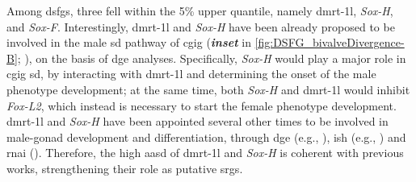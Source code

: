 Among \glspl{dsfg}, three fell within the 5\% upper quantile, namely \gls{dmrt-1l}, \textit{Sox-H}, and \textit{Sox-F}. Interestingly, \gls{dmrt-1l} and \textit{Sox-H} have been already proposed to be involved in the male \gls{sd} pathway of \gls{cgig} (\textbf{\textit{inset}} in \cref{fig:DSFG_bivalveDivergence-B}; \textbf{\cite{zhang2014genomic}}), on the basis of \gls{dge} analyses. Specifically, \textit{Sox-H} would play a major role in \gls{cgig} \gls{sd}, by interacting with \gls{dmrt-1l} and determining the onset of the male phenotype development; at the same time, both \textit{Sox-H} and \gls{dmrt-1l} would inhibit \textit{Fox-L2}, which instead is necessary to start the female phenotype development. \gls{dmrt-1l} and \textit{Sox-H} have been appointed several other times to be involved in male-gonad development and differentiation, through \gls{dge} (e.g., \textbf{\cite{teaniniuraitemoana2014gonad, capt2018deciphering, afonso2019gonad}}), \gls{ish} (e.g., \textbf{\cite{naimi2009molecular,li2018foxl2, yue2021variance, liang2019sox2}}) and \gls{rnai} (\textbf{\cite{liang2019sox2, sun2022examination}}). Therefore, the high \gls{aasd} of \gls{dmrt-1l} and \textit{Sox-H} is coherent with previous works, strengthening their role as putative \glspl{srg}.

